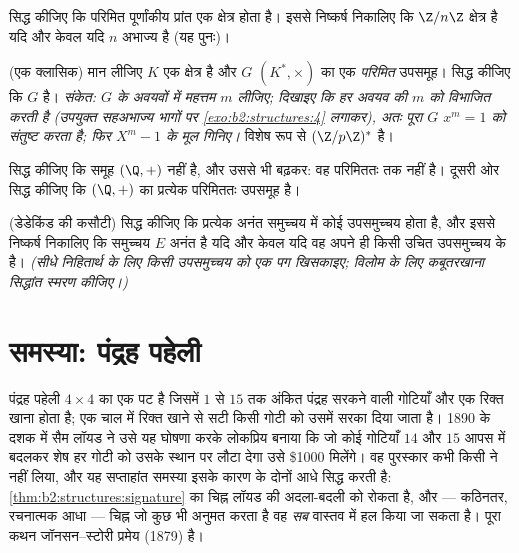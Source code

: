 \begin{exercise}[$\star\star\star$]\label{exo:b2:structures:9}
सिद्ध कीजिए कि परिमित पूर्णांकीय प्रांत एक क्षेत्र होता है। इससे
निष्कर्ष निकालिए कि $\Z/n\Z$ क्षेत्र है यदि और केवल यदि $n$ अभाज्य है (यह
पुनः)।
\end{exercise}

\begin{exercise}[$\star\star\star$]\label{exo:b2:structures:10}
(एक क्लासिक) मान लीजिए $K$ एक क्षेत्र है और $G$ $(K^*, \times)$ का एक
\emph{परिमित} उपसमूह। सिद्ध कीजिए कि $G$  है। \emph{संकेत: $G$
के अवयवों में महत्तम  $m$ लीजिए; दिखाइए कि हर अवयव की  $m$ को
विभाजित करती है (उपयुक्त सहअभाज्य भागों पर \cref{exo:b2:structures:4} लगाकर), अतः पूरा $G$
$x^m = 1$ को संतुष्ट करता है; फिर $X^m - 1$ के मूल गिनिए।} विशेष रूप से $(\Z/p\Z)^*$
 है।
\end{exercise}

\begin{exercise}[$\star\star\star$]\label{exo:b2:structures:11}
सिद्ध कीजिए कि समूह $(\Q, +)$  नहीं है, और उससे भी बढ़कर: वह परिमिततः
 तक नहीं है। दूसरी ओर सिद्ध कीजिए कि $(\Q, +)$ का प्रत्येक परिमिततः 
उपसमूह  है।
\end{exercise}

\begin{exercise}[$\star\star$]\label{exo:b2:structures:12}
(डेडेकिंड की कसौटी) सिद्ध कीजिए कि प्रत्येक अनंत समुच्चय में कोई 
उपसमुच्चय होता है, और इससे निष्कर्ष निकालिए कि समुच्चय $E$ अनंत है यदि
और केवल यदि वह अपने ही किसी उचित उपसमुच्चय के  है। \emph{(सीधे
निहितार्थ के लिए किसी  उपसमुच्चय को एक पग खिसकाइए; विलोम के लिए
कबूतरखाना सिद्धांत स्मरण कीजिए।)}
\end{exercise}

\section{समस्या: पंद्रह पहेली}

पंद्रह पहेली $4 \times 4$ का एक पट है जिसमें $1$ से $15$ तक अंकित पंद्रह
सरकने वाली गोटियाँ और एक रिक्त खाना होता है; एक चाल में रिक्त खाने से
सटी किसी गोटी को उसमें सरका दिया जाता है। 1890 के दशक में सैम लॉयड ने
उसे यह घोषणा करके लोकप्रिय बनाया कि जो कोई गोटियाँ $14$ और $15$ आपस में
बदलकर शेष हर गोटी को उसके स्थान पर लौटा देगा उसे \$1000 मिलेंगे। वह
पुरस्कार कभी किसी ने नहीं लिया, और यह सप्ताहांत समस्या इसके कारण के
दोनों आधे सिद्ध करती है: \cref{thm:b2:structures:signature} का चिह्न लॉयड की अदला-बदली को रोकता है,
और --- कठिनतर, रचनात्मक आधा --- चिह्न जो कुछ भी अनुमत करता है वह
\emph{सब} वास्तव में हल किया जा सकता है। पूरा कथन जॉनसन--स्टोरी प्रमेय
(1879) है।

